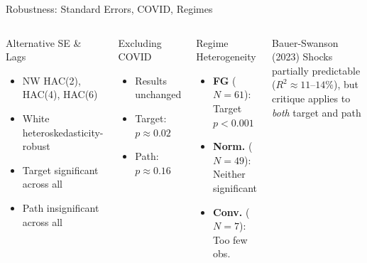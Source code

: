 \documentclass[aspectratio=169, 11pt]{beamer}
\begin{document}
\begin{frame}{Robustness: Standard Errors, COVID, Regimes}
\begin{columns}[T]
\begin{ablock}{Alternative SE \& Lags}
\begin{itemize}
  \item NW HAC(2), HAC(4), HAC(6)
  \item White heteroskedasticity-robust
  \item Target significant across all
  \item Path insignificant across all
\end{itemize}
\end{ablock}
\vspace{0.2em}
\begin{aexampleblock}{Excluding COVID}
\begin{itemize}
  \item Results unchanged
  \item Target: $p \approx 0.02$
  \item Path: $p \approx 0.16$
\end{itemize}
\end{aexampleblock}

\begin{ablock}{Regime Heterogeneity}
\begin{itemize}
  \item \textbf{FG} ($N\!=\!61$): Target $p\!<\!0.001$
  \item \textbf{Norm.} ($N\!=\!49$): Neither significant
  \item \textbf{Conv.} ($N\!=\!7$): Too few obs.
\end{itemize}
\end{ablock}
\vspace{0.2em}
\begin{aalertblock}{Bauer-Swanson (2023)}
Shocks partially predictable ($R^2 \approx 11$--$14\%$), but critique applies to \emph{both} target and path
\end{aalertblock}
\end{columns}
\end{frame}
\end{document}
